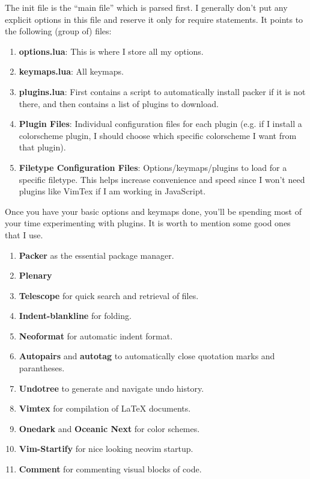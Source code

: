   The init file is the ``main file'' which is parsed first. I generally don't put any explicit options in this file and reserve it only for require statements. It points to the following (group of) files: 
  \begin{enumerate}
    \item \textbf{options.lua}: This is where I store all my options. 
    \item \textbf{keymaps.lua}: All keymaps. 
    \item \textbf{plugins.lua}: First contains a script to automatically install packer if it is not there, and then contains a list of plugins to download. 
    \item \textbf{Plugin Files}: Individual configuration files for each plugin (e.g. if I install a colorscheme plugin, I should choose which specific colorscheme I want from that plugin). 
    \item \textbf{Filetype Configuration Files}: Options/keymaps/plugins to load for a specific filetype. This helps increase convenience and speed since I won't need plugins like VimTex if I am working in JavaScript. 
  \end{enumerate}

  Once you have your basic options and keymaps done, you'll be spending most of your time experimenting with plugins. It is worth to mention some good ones that I use. 
  \begin{enumerate}
    \item \textbf{Packer} as the essential package manager.  
    \item \textbf{Plenary} 
    \item \textbf{Telescope} for quick search and retrieval of files.  
    \item \textbf{Indent-blankline} for folding. 
    \item \textbf{Neoformat} for automatic indent format. 
    \item \textbf{Autopairs} and \textbf{autotag} to automatically close quotation marks and parantheses. 
    \item \textbf{Undotree} to generate and navigate undo history. 
    \item \textbf{Vimtex} for compilation of LaTeX documents. 
    \item \textbf{Onedark} and \textbf{Oceanic Next} for color schemes. 
    \item \textbf{Vim-Startify} for nice looking neovim startup. 
    \item \textbf{Comment} for commenting visual blocks of code. 
  \end{enumerate}

